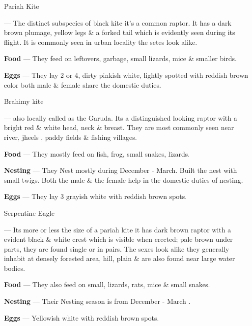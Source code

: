 \begin{bird}{Pariah Kite}

 --- The distinct subspecies of black kite it's a common raptor. It has a dark brown plumage, yellow legs \& a forked tail which is evidently seen during its flight. It is commonly seen in urban locality the setes look alike.

{\large\bf Food} --- They feed on leftovers, garbage, small lizards, mice \& smaller birds. 

{\large\bf Eggs} --- They lay 2 or 4, dirty pinkish white, lightly spotted with reddish brown color both male \& female share the domestic duties.
\end{bird}

\begin{bird}{Brahimy kite}

 --- also locally called as the Garuda. Its a distinguished looking raptor with a bright red \& white head, neck \& breast. They  are most commonly seen near river, jheels , paddy fields \& fishing villages.

{\large\bf Food} --- They mostly feed on fish, frog, small snakes, lizards. 

{\large\bf Nesting} --- They Nest mostly during December - March. Built the nest with small twigs. Both  the male \& the female help in the domestic duties of nesting. 

{\large\bf Eggs} --- They lay 3 grayish white with reddish brown spots.
\end{bird}

\newpage

\begin{bird}{Serpentine Eagle}

 --- Its more or less the size of a pariah kite it has dark brown raptor with a evident black \& white crest which is visible when erected; pale brown under parts, they are found single or in pairs. The sexes look alike they generally inhabit at densely forested area, hill, plain \& are also found near large water bodies.

{\large\bf Food} --- They also feed on small, lizards, rats, mice \& small snakes. 

{\large\bf Nesting} --- Their Nesting season is from December - March . 

{\large\bf Eggs} --- Yellowish white with reddish brown spots.
\end{bird}


